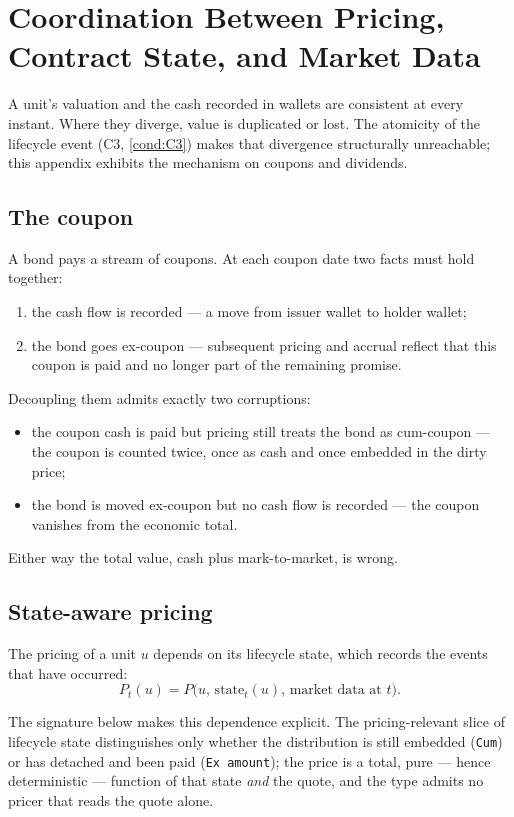 \section{Coordination Between Pricing, Contract State, and Market Data}
\label{sec:appD}

A unit's valuation and the cash recorded in wallets are consistent at every instant. Where they diverge, value is duplicated or lost. The atomicity of the lifecycle event (C3, \ref{cond:C3}) makes that divergence structurally unreachable; this appendix exhibits the mechanism on coupons and dividends.

\subsection{The coupon}

A bond pays a stream of coupons. At each coupon date two facts must hold together:

\begin{enumerate}
\item the cash flow is recorded --- a move from issuer wallet to holder wallet;
\item the bond goes ex-coupon --- subsequent pricing and accrual reflect that this coupon is paid and no longer part of the remaining promise.
\end{enumerate}

Decoupling them admits exactly two corruptions:

\begin{itemize}
\item the coupon cash is paid but pricing still treats the bond as cum-coupon --- the coupon is counted twice, once as cash and once embedded in the dirty price;
\item the bond is moved ex-coupon but no cash flow is recorded --- the coupon vanishes from the economic total.
\end{itemize}

Either way the total value, cash plus mark-to-market, is wrong.

\subsection{State-aware pricing}

The pricing of a unit $u$ depends on its lifecycle state, which records the events that have occurred:
\[
P_t(u) = P\big(u,\, \mathrm{state}_t(u),\, \text{market data at } t\big).
\]

\noindent The signature below makes this dependence explicit. The pricing-relevant slice of lifecycle state distinguishes only whether the distribution is still embedded (\lstinline|Cum|) or has detached and been paid (\lstinline|Ex amount|); the price is a total, pure --- hence deterministic --- function of that state \emph{and} the quote, and the type admits no pricer that reads the quote alone.

